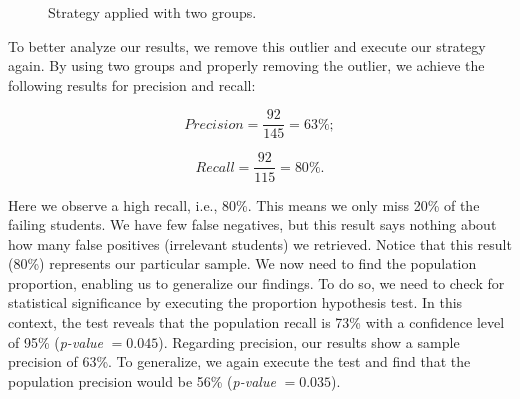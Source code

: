 \begin{figure}[ht]
\begin{center}
{             \label{fig:2-2013-01}
         }
     \end{center}
     \caption{Strategy applied with two groups.}
	 \label{fig:2-groups}
\end{figure}

To better analyze our results, we remove this outlier and execute our strategy again. By using two groups and properly removing the outlier, we achieve the following results for precision and recall:

\vspace{0.2cm}
\noindent
\begin{minipage}{.5\linewidth}
\centering
$$
Precision = \frac{92}{145} = 63\%;
$$
\end{minipage}
\begin{minipage}{.5\linewidth}
$$
Recall = \frac{92}{115} = 80\%.
$$
\end{minipage}
\vspace{0.2cm}

Here we observe a high recall, i.e., 80\%. This means we only miss 20\% of the failing students. We have few false negatives, but this result says nothing about how many false positives (irrelevant students) we retrieved. Notice that this result (80\%) represents our particular sample. We now need to find the population proportion, enabling us to generalize our findings. To do so, we need to check for statistical significance by executing the proportion hypothesis test. In this context, the test reveals that the population recall is 73\% with a confidence level of 95\% (\textit{p-value} $= 0.045$). Regarding precision, our results show a sample precision of 63\%. To generalize, we again execute the test and find that the population precision would be 56\% (\textit{p-value} $= 0.035$).

